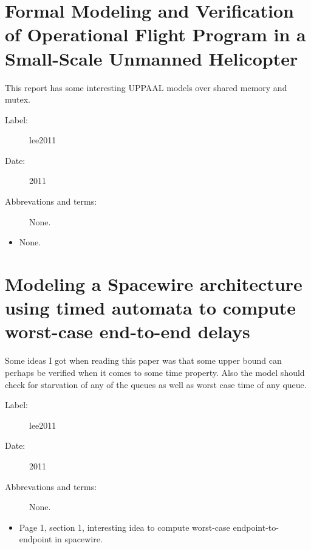 \section{Formal Modeling and Verification of Operational Flight Program in a
Small-Scale Unmanned Helicopter}
This report has some interesting UPPAAL models over shared memory and mutex.

\begin{description}
    \item[Label:] lee2011 \cite{lee2011}
    \item[Date:] 2011
    \item[Abbrevations and terms:] None.
\end{description}

\begin{itemize}
    \item None.
\end{itemize}

\section{Modeling a Spacewire architecture using timed automata to compute
worst-case end-to-end delays}
Some ideas I got when reading this paper was that some upper bound can perhaps
be verified when it comes to some time property. Also the model should check
for starvation of any of the queues as well as worst case time of any queue.

\begin{description}
    \item[Label:] lee2011 \cite{lee2011}
    \item[Date:] 2011
    \item[Abbrevations and terms:] None.
\end{description}

\begin{itemize}
    \item Page 1, section 1, interesting idea to compute worst-case
        endpoint-to-endpoint in spacewire.
\end{itemize}

